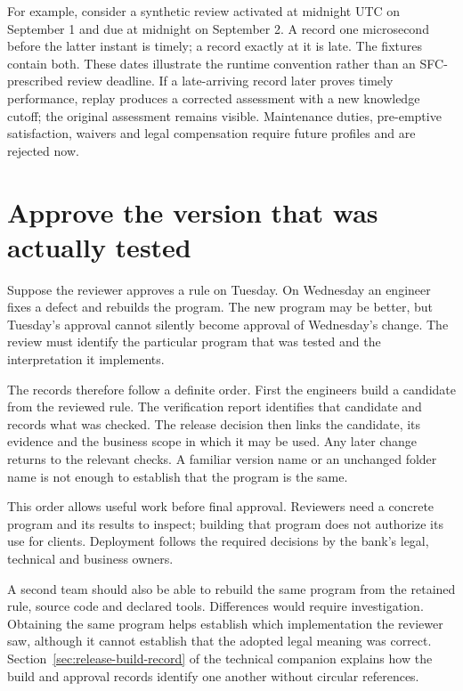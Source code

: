 For example, consider a synthetic review activated at midnight UTC on September
1 and due at midnight on September 2. A record one microsecond before the latter
instant is timely; a record exactly at it is late. The fixtures contain both.
These dates illustrate the runtime convention rather than an SFC-prescribed
review deadline. If a late-arriving record later proves timely performance,
replay produces a corrected assessment with a new knowledge cutoff; the original
assessment remains visible. Maintenance duties, pre-emptive satisfaction,
waivers and legal compensation require future profiles and are rejected now.

\section{Approve the version that was actually tested}
\label{merge:M07:12}

Suppose the reviewer approves a rule on Tuesday. On Wednesday an engineer fixes
a defect and rebuilds the program. The new program may be better, but Tuesday's
approval cannot silently become approval of Wednesday's change. The review must
identify the particular program that was tested and the interpretation it
implements.

The records therefore follow a definite order. First the engineers build a
candidate from the reviewed rule. The verification report identifies that
candidate and records what was checked. The release decision then links the
candidate, its evidence and the business scope in which it may be used. Any
later change returns to the relevant checks. A familiar version name or an
unchanged folder name is not enough to establish that the program is the same.



This order allows useful work before final approval. Reviewers need a concrete
program and its results to inspect; building that program does not authorize its
use for clients. Deployment follows the required decisions by the bank's legal,
technical and business owners.

A second team should also be able to rebuild the same program from the retained
rule, source code and declared tools. Differences would require investigation.
Obtaining the same program helps establish which implementation the reviewer
saw, although it cannot establish that the adopted legal meaning was correct.
Section~\ref{sec:release-build-record} of the technical companion explains how
the build and approval records identify one another without circular references.

